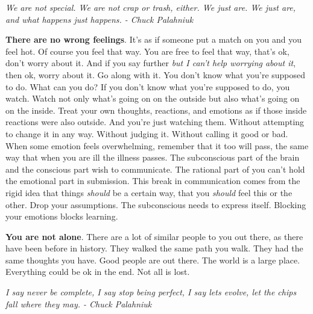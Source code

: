 \documentclass[a4paper,hidelinks]{article}
\begin{document}
\newpage

\begin{center}
\textit{
We are not special. We are not crap or trash, either. We just are. We just are, and what happens just happens. - Chuck Palahniuk
}
\end{center}

\textbf{There are no wrong feelings}.
It's as if someone put a match on you and you feel hot.
Of course you feel that way.
You are free to feel that way, that's ok, don't worry about it.
And if you say further \textit{but I can't help worrying about it}, then ok, worry about it.
Go along with it.
You don't know what you're supposed to do.
What can you do?
If you don't know what you're supposed to do, you watch.
Watch not only what's going on on the outside but also what's going on on the inside.
Treat your own thoughts, reactions, and emotions as if those inside reactions were also outside.
And you're just watching them.
Without attempting to change it in any way.
Without judging it.
Without calling it good or bad.
When some emotion feels overwhelming, remember that it too will pass, the same way that when you are ill the illness passes.
The subconscious part of the brain and the conscious part wish to communicate.
The rational part of you can't hold the emotional part in submission.
This break in communication comes from the rigid idea that things \textit{should} be a certain way, that you \textit{should} feel this or the other.
Drop your assumptions.
The subconscious needs to express itself.
Blocking your emotions blocks learning.


\newpage

\textbf{You are not alone}.
There are a lot of similar people to you out there, as there have been before in history.
They walked the same path you walk.
They had the same thoughts you have.
Good people are out there.
The world is a large place.
Everything could be ok in the end.
Not all is lost.

\newpage

\begin{center}
\textit{
I say never be complete, I say stop being perfect, I say lets evolve, let the chips fall where they may. - Chuck Palahniuk
}
\end{center}
\end{document}
